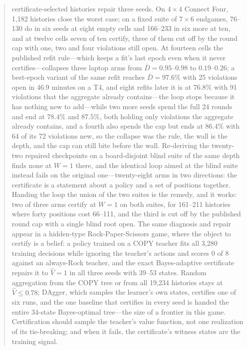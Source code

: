 \documentclass[conference]{IEEEtran}
\begin{document}
\begin{abstract}
certificate-selected histories repair three seeds. On $4\times4$ Connect Four, 1{,}182 histories close the worst case; on a fixed suite of $7\times6$ endgames, 76--130 do in six seeds at eight empty cells and 166--233 in six more at ten, and at twelve cells seven of ten certify, three of them cut off by the round cap with one, two and four violations still open. At fourteen cells the published refit rule---which keeps a fit's last epoch even when it never certifies---collapses three laptop arms from $\bar D=0.95$--$0.98$ to $0.19$--$0.26$; a best-epoch variant of the same refit reaches $\bar D=97.6\%$ with 25 violations open in 46.9 minutes on a T4, and eight refits later it is at $76.8\%$ with 91 violations that the aggregate already contains---the loop stops because it has nothing new to add---while two more seeds spend the full 24 rounds and end at $78.4\%$ and $87.5\%$, both holding only violations the aggregate already contains, and a fourth also spends the cap but ends at $86.4\%$ with 64 of its 72 violations new, so the collapse was the rule, the wall is the depth, and the cap can still bite before the wall. Re-deriving the twenty-two repaired checkpoints on a board-disjoint blind suite of the same depth finds none at $W=1$ there, and the identical loop aimed at the blind suite instead fails on the original one---twenty-eight arms in two directions: the certificate is a statement about a policy and a set of positions together. Handing the loop the union of the two suites is the remedy, and it works: two of three arms certify at $W=1$ on both suites, for 161--211 histories where forty positions cost 66--111, and the third is cut off by the published round cap with a single blind root open. The same diagnosis and repair appear in a hidden-type Rock-Paper-Scissors game, where the object to certify is a belief: a policy trained on a COPY teacher fits all 3{,}280 training decisions while ignoring the teacher's actions and scores 0 of 8 against an always-Rock teacher, and the exact Bayes-adaptive certificate repairs it to $\hat V=1$ in all three seeds with 39--53 states. Random aggregation from the COPY tree or from all 19{,}234 histories stays at $\hat V\le0.78$; DAgger, which samples the learner's own states, certifies one of six runs, and the one baseline that certifies in every seed is handed the entire 34-state Bayes-optimal tree---the size of a frontier in this game. Certification should sample the teacher's value function, not one realization of its tie-breaking; and when it fails, the certificate's witness states are the training signal.
\end{abstract}
\end{document}
